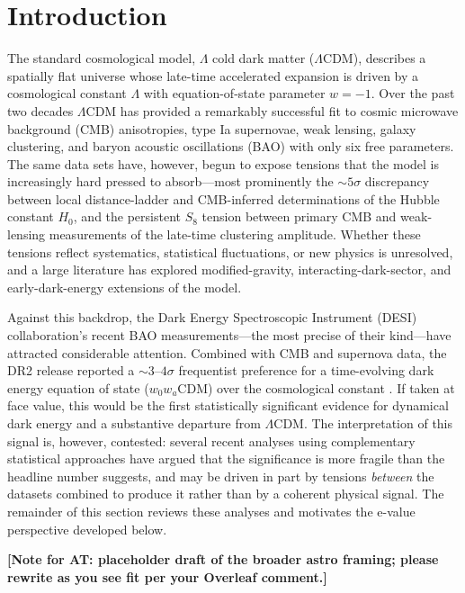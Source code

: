 \documentclass[11pt,a4paper]{article}
\newcommand{\LCDM}{$\Lambda$CDM}
\begin{document}
\section{Introduction}
\label{sec:intro}

The standard cosmological model, $\Lambda$ cold dark matter (\LCDM), describes a spatially flat universe whose late-time accelerated expansion is driven by a cosmological constant $\Lambda$ with equation-of-state parameter $w = -1$. Over the past two decades \LCDM{} has provided a remarkably successful fit to cosmic microwave background (CMB) anisotropies, type Ia supernovae, weak lensing, galaxy clustering, and baryon acoustic oscillations (BAO) with only six free parameters. The same data sets have, however, begun to expose tensions that the model is increasingly hard pressed to absorb---most prominently the $\sim 5\sigma$ discrepancy between local distance-ladder and CMB-inferred determinations of the Hubble constant $H_0$, and the persistent $S_8$ tension between primary CMB and weak-lensing measurements of the late-time clustering amplitude. Whether these tensions reflect systematics, statistical fluctuations, or new physics is unresolved, and a large literature has explored modified-gravity, interacting-dark-sector, and early-dark-energy extensions of the model.

Against this backdrop, the Dark Energy Spectroscopic Instrument (DESI) collaboration's recent BAO measurements---the most precise of their kind---have attracted considerable attention. Combined with CMB and supernova data, the DR2 release reported a $\sim 3$--$4\sigma$ frequentist preference for a time-evolving dark energy equation of state ($w_0w_a$CDM) over the cosmological constant \citep{DESI2025}. If taken at face value, this would be the first statistically significant evidence for dynamical dark energy and a substantive departure from \LCDM. The interpretation of this signal is, however, contested: several recent analyses using complementary statistical approaches have argued that the significance is more fragile than the headline number suggests, and may be driven in part by tensions \emph{between} the datasets combined to produce it rather than by a coherent physical signal. The remainder of this section reviews these analyses and motivates the e-value perspective developed below.

\noindent\textbf{[Note for AT: placeholder draft of the broader astro framing; please rewrite as you see fit per your Overleaf comment.]}
\end{document}
